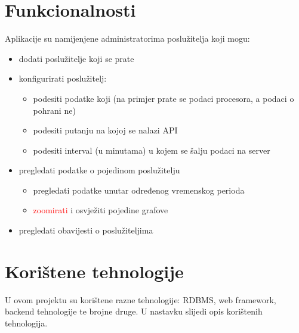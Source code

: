 \documentclass[zavrsnirad]{fer}
\begin{document}
\chapter{Funkcionalnosti}
\label{pog:opis_problema}
Aplikacije su namijenjene administratorima poslužitelja koji mogu:
\begin{itemize}
	\item dodati poslužitelje koji se prate
	\item konfigurirati poslužitelj:
	\begin{itemize}
		\item podesiti podatke koji (na primjer prate se podaci procesora, a podaci o pohrani ne)
		\item podesiti putanju na kojoj se nalazi API
		\item podesiti interval (u minutama) u kojem se šalju podaci na server
	\end{itemize}
	\item pregledati podatke o pojedinom poslužitelju
	\begin{itemize}
		\item pregledati podatke unutar određenog vremenskog perioda
		\item \textcolor{red}{zoomirati} i osvježiti pojedine grafove
	\end{itemize}
	\item pregledati obavijesti o poslužiteljima
\end{itemize}

\chapter{Korištene tehnologije}
\label{pog:koristene_tehnologije}
U ovom projektu su korištene razne tehnologije: RDBMS, web framework, backend tehnologije te brojne druge. U nastavku slijedi opis korištenih tehnologija.
\end{document}
